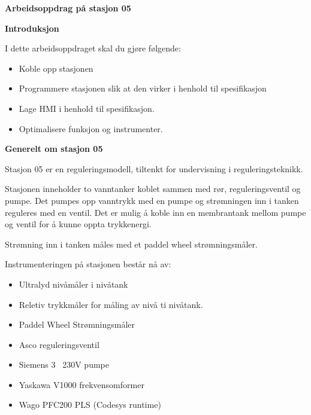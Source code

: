 \newpage


\begin{center}
\textbf{Arbeidsoppdrag på stasjon 05}
\vskip 5pt 
\vskip 5pt 
\end{center}

\vskip 10pt 
\textbf{Introduksjon}

\vskip 5pt 
I dette arbeidsoppdraget skal du gjøre følgende:
\begin{itemize}[noitemsep]
	\item Koble opp stasjonen 
	\item Programmere stasjonen slik at den virker i henhold til spesifikasjon
	\item Lage HMI i henhold til spesifikasjon. 
	\item Optimalisere funksjon og instrumenter. 
\end{itemize}

\textbf{Generelt om stasjon 05}
\vskip 5pt 

Stasjon 05 er en reguleringsmodell, tiltenkt for undervisning i reguleringsteknikk.  

Stasjonen inneholder to vanntanker koblet sammen med rør, reguleringsventil og pumpe. Det pumpes opp vanntrykk med en pumpe og strømningen inn i tanken reguleres med en ventil. Det er mulig å koble inn en membrantank mellom pumpe og ventil for å kunne oppta trykkenergi.  

Strømning inn i tanken måles med et paddel wheel strømningsmåler.   

Instrumenteringen på stasjonen består nå av:  
\begin{itemize}[noitemsep]
	\item Ultralyd nivåmåler i nivåtank
	\item Reletiv trykkmåler for måling av nivå ti nivåtank.
	\item Paddel Wheel Strømningsmåler 
	\item Asco reguleringsventil
	\item Siemens 3~ 230V pumpe
	\item Yaskawa V1000 frekvensomformer
	\item Wago PFC200 PLS (Codesys runtime)
\end{itemize}


